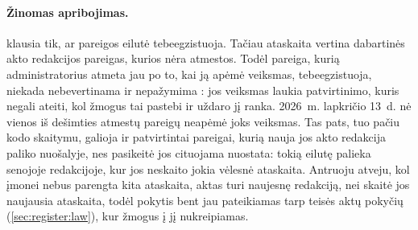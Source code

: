 \paragraph{Žinomas apribojimas.}  klausia tik, ar pareigos eilutė tebeegzistuoja.
Tačiau ataskaita vertina dabartinės akto redakcijos pareigas, kurios nėra atmestos. Todėl pareiga,
kurią administratorius atmeta jau po to, kai ją apėmė veiksmas, tebeegzistuoja, niekada
nebevertinama ir nepažymima : jos veiksmas laukia patvirtinimo, kuris negali
ateiti, kol žmogus tai pastebi ir uždaro jį ranka. 2026~m. lapkričio 13~d. nė vienos iš dešimties
atmestų pareigų neapėmė joks veiksmas. Tas pats, tuo pačiu kodo skaitymu, galioja ir patvirtintai
pareigai, kurią nauja jos akto redakcija paliko nuošalyje, nes pasikeitė jos cituojama nuostata:
 tokią eilutę palieka senojoje redakcijoje, kur jos neskaito jokia vėlesnė
ataskaita. Antruoju atveju, kol įmonei nebus parengta kita ataskaita, aktas turi naujesnę redakciją, nei skaitė
jos naujausia ataskaita, todėl pokytis bent jau pateikiamas tarp teisės aktų pokyčių
(\cref{sec:register:law}), kur žmogus į jį nukreipiamas.
